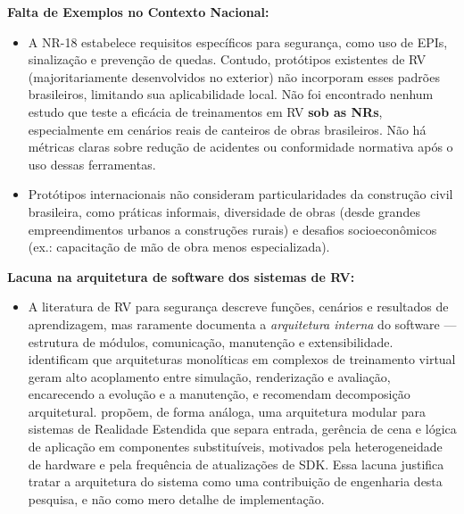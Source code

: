 \textbf{Falta de Exemplos no Contexto Nacional:}
\begin{itemize}
    \item A NR-18 \cite{brasil2025nr18} estabelece requisitos específicos para segurança, como uso de EPIs, sinalização e prevenção de quedas. Contudo, protótipos existentes de RV (majoritariamente desenvolvidos no exterior) não incorporam esses padrões brasileiros, limitando sua aplicabilidade local. Não foi encontrado nenhum estudo que teste a eficácia de treinamentos em RV \textbf{sob as NRs}, especialmente em cenários reais de canteiros de obras brasileiros. Não há métricas claras sobre redução de acidentes ou conformidade normativa após o uso dessas ferramentas.
    \item Protótipos internacionais não consideram particularidades da construção civil brasileira, como práticas informais, diversidade de obras (desde grandes empreendimentos urbanos a construções rurais) e desafios socioeconômicos (ex.: capacitação de mão de obra menos especializada).
\end{itemize}

\textbf{Lacuna na arquitetura de software dos sistemas de RV:}
\begin{itemize}
    \item A literatura de RV para segurança descreve funções, cenários e resultados de aprendizagem, mas raramente documenta a \textit{arquitetura interna} do software --- estrutura de módulos, comunicação, manutenção e extensibilidade.  identificam que arquiteturas monolíticas em complexos de treinamento virtual geram alto acoplamento entre simulação, renderização e avaliação, encarecendo a evolução e a manutenção, e recomendam decomposição arquitetural.  propõem, de forma análoga, uma arquitetura modular para sistemas de Realidade Estendida que separa entrada, gerência de cena e lógica de aplicação em componentes substituíveis, motivados pela heterogeneidade de hardware e pela frequência de atualizações de \gls{SDK}. Essa lacuna justifica tratar a arquitetura do sistema como uma contribuição de engenharia desta pesquisa, e não como mero detalhe de implementação.
\end{itemize}
